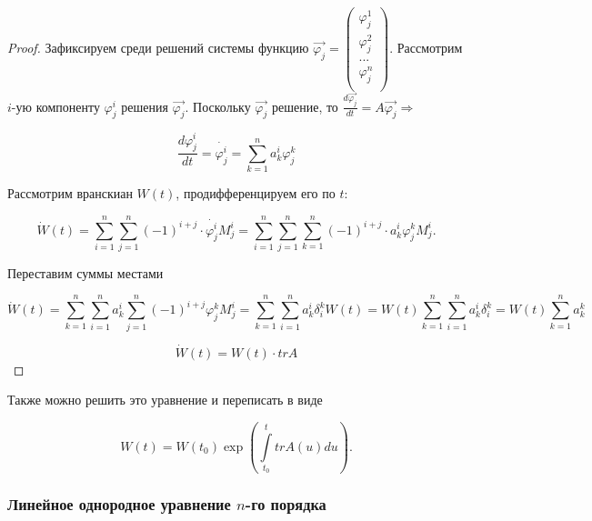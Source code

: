\begin{proof}

Зафиксируем среди решений системы функцию $\overrightarrow{\varphi_j}=
\begin{pmatrix}
  \varphi_j^1 \\
  \varphi_j^2 \\
  ...   \\
  \varphi_j^n \\
\end{pmatrix}
$.
Рассмотрим $i$-ую компоненту $\varphi_j^i$ решения $\overrightarrow{\varphi_j}$. Поскольку $\overrightarrow{\varphi_j}$ решение, то $\frac{d\overrightarrow{\varphi_j}}{dt} = A\overrightarrow{\varphi_j} \Rightarrow$

\[\frac{d\varphi_j^i}{dt} = \dot{\varphi_j^i} = \sum\limits_{k = 1}^n{a_k^i \varphi_j^k}\]

Рассмотрим вранскиан $W(t)$, продифференцируем его по $t$:

\[\dot{W}(t) = \sum\limits_{i = 1}^n{\sum\limits_{j = 1}^n{(-1)^{i + j} \cdot \dot{\varphi_j^i} M_j^i}} = \sum\limits_{i = 1}^n{\sum\limits_{j = 1}^n{\sum\limits_{k = 1}^n{(-1)^{i + j} \cdot a_k^i \varphi_j^k M_j^i}}}.\]

Переставим суммы местами

\[\dot{W}(t) = \sum\limits_{k = 1}^n{\sum\limits_{i = 1}^n{a_k^i}{\sum\limits_{j = 1}^n{(-1)^{i + j} \varphi_j^k M_j^i}}} = \sum\limits_{k = 1}^n{\sum\limits_{i = 1}^n{a_k^i}\delta_i^k W(t)} = W(t)\sum\limits_{k = 1}^n{\sum\limits_{i = 1}^n{a_k^i}\delta_i^k} = W(t)\sum\limits_{k = 1}^n{a_k^k}\]

\[\dot{W}(t) = W(t) \cdot trA\]

\end{proof}

Также можно решить это уравнение и переписать в виде

\[W(t) = W(t_0)\exp{\left(\int\limits_{t_0}^{t}trA(u)du\right)}.\]

\subsubsection{Линейное однородное уравнение $n$-го порядка}

